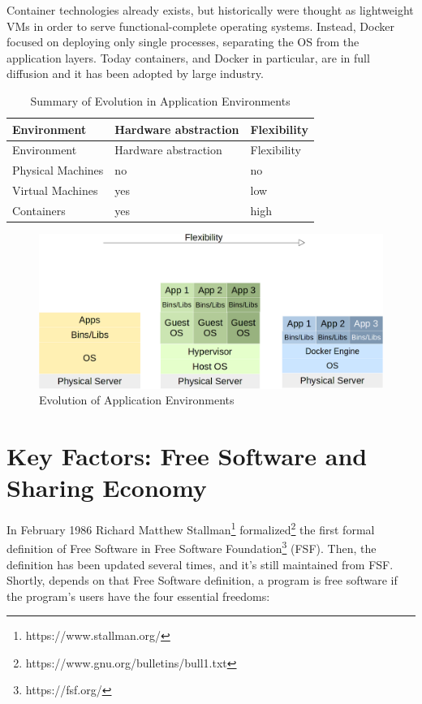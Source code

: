 Container technologies already exists, but historically were thought as
lightweight VMs in order to serve functional-complete operating systems.
Instead, Docker focused on deploying only single processes, separating
the OS from the application layers. Today containers, and Docker in
particular, are in full diffusion and it has been adopted by large
industry.

\begin{longtable}[c]{@{}lll@{}}
\caption{Summary of Evolution in Application
Environments}\tabularnewline
\toprule
Environment & Hardware abstraction & Flexibility\tabularnewline
\midrule
\endfirsthead
\toprule
Environment & Hardware abstraction & Flexibility\tabularnewline
\midrule
\endhead
Physical Machines & no & no\tabularnewline
Virtual Machines & yes & low\tabularnewline
Containers & yes & high\tabularnewline
\bottomrule
\end{longtable}

\begin{figure}[htbp]
\centering
\includegraphics{media/ch2-containers.png}
\caption{Evolution of Application Environments}
\end{figure}

\section{Key Factors: Free Software and Sharing
Economy}\label{key-factors-free-software-and-sharing-economy}

In February 1986 Richard Matthew Stallman\footnote{https://www.stallman.org/} formalized\footnote{https://www.gnu.org/bulletins/bull1.txt} the first formal definition of Free Software in Free Software Foundation\footnote{https://fsf.org/} (FSF).  Then, the definition has been updated several times, and it's still maintained from FSF.  Shortly, depends on that Free Software definition\cite{FreeSoftwareDefinition}, a program is free software if the program's users have the four essential freedoms:


